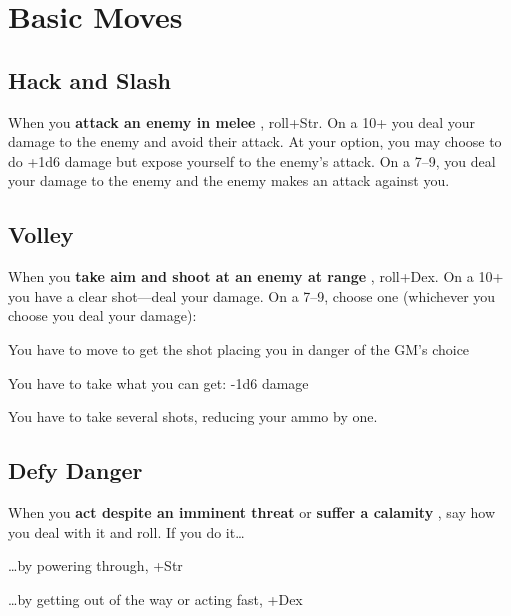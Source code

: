 \chapter{Basic Moves}
   
 


\section{Hack and Slash}    
 

When you {\bf attack an enemy in melee} , roll+Str. On a 10+ you deal your damage to the enemy and avoid their attack. At your option, you may choose to do +1d6 damage but expose yourself to the enemy's attack. On a 7–9, you deal your damage to the enemy and the enemy makes an attack against you.

 
\section{Volley}   
 

When you {\bf take aim and shoot at an enemy at range} , roll+Dex. On a 10+ you have a clear shot—deal your damage. On a 7–9, choose one (whichever you choose you deal your damage):

 
\startitemize[1,packed]

\item You have to move to get the shot placing you in danger of the GM's choice

 
\item You have to take what you can get: -1d6 damage

 
\item You have to take several shots, reducing your ammo by one.


\stopitemize
 
\section{Defy Danger}    
 

When you {\bf act despite an imminent threat}  or {\bf suffer a calamity} , say how you deal with it and roll. If you do it…

 
\startitemize[1,packed]

\item …by powering through, +Str

 
\item …by getting out of the way or acting fast, +Dex

